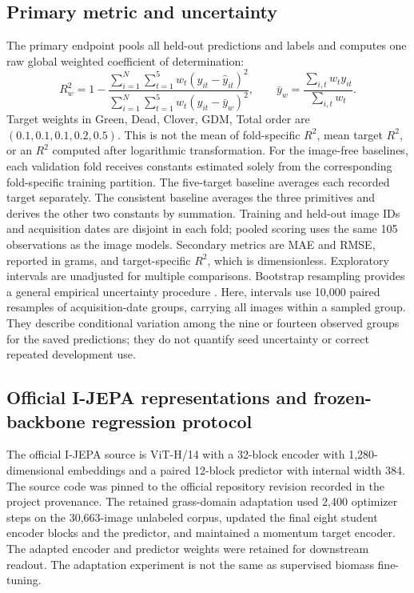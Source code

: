 \documentclass[pdflatex,a4paper,sn-nature]{sn-jnl}
\begin{document}
\subsection{Primary metric and uncertainty}
The primary endpoint pools all held-out predictions and labels and computes one raw global weighted coefficient of determination:
\begin{equation}
R_w^2=1-\frac{\sum_{i=1}^{N}\sum_{t=1}^{5}w_t(y_{it}-\hat y_{it})^2}{\sum_{i=1}^{N}\sum_{t=1}^{5}w_t(y_{it}-\bar y_w)^2},\qquad
\bar y_w=\frac{\sum_{i,t}w_ty_{it}}{\sum_{i,t}w_t}.
\end{equation}
Target weights in Green, Dead, Clover, GDM, Total order are $(0.1,0.1,0.1,0.2,0.5)$. This is not the mean of fold-specific $R^2$, mean target $R^2$, or an $R^2$ computed after logarithmic transformation. For the image-free baselines, each validation fold receives constants estimated solely from the corresponding fold-specific training partition. The five-target baseline averages each recorded target separately. The consistent baseline averages the three primitives and derives the other two constants by summation. Training and held-out image IDs and acquisition dates are disjoint in each fold; pooled scoring uses the same 105 observations as the image models. Secondary metrics are MAE and RMSE, reported in grams, and target-specific $R^2$, which is dimensionless. Exploratory intervals are unadjusted for multiple comparisons. Bootstrap resampling provides a general empirical uncertainty procedure \cite{efron1979bootstrap}. Here, intervals use 10,000 paired resamples of acquisition-date groups, carrying all images within a sampled group. They describe conditional variation among the nine or fourteen observed groups for the saved predictions; they do not quantify seed uncertainty or correct repeated development use.

\subsection{Official I-JEPA representations and frozen-backbone regression protocol}
The official I-JEPA source is ViT-H/14 with a 32-block encoder with 1,280-dimensional embeddings and a paired 12-block predictor with internal width 384. The source code was pinned to the official repository revision recorded in the project provenance. The retained grass-domain adaptation used 2,400 optimizer steps on the 30,663-image unlabeled corpus, updated the final eight student encoder blocks and the predictor, and maintained a momentum target encoder. The adapted encoder and predictor weights were retained for downstream readout. The adaptation experiment is not the same as supervised biomass fine-tuning.
\end{document}
